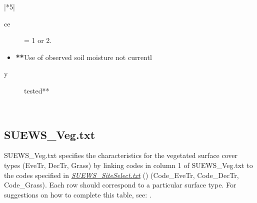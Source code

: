 \documentclass[letterpaper,10pt,english]{sphinxmanual}
\begin{document}
\begin{savenotes}
\begin{tabular}[t]{|*{5}{|}}
\begin{itemize}
\end{itemize}
\begin{description}
\item[{ce}] \leavevmode
= 1 or
2.

\end{description}
\begin{itemize}
\item {} 
{\color{red}\bfseries{}**}Use of
observed
soil
moisture
not
currentl

\end{itemize}
\begin{description}
\item[{y}] \leavevmode
tested**

\end{description}
\\
\hline
\end{tabular}
\par
\sphinxattableend\end{savenotes}


\subsection{SUEWS\_Veg.txt}
\label{\detokenize{input_files/SUEWS_SiteInfo/SUEWS_Veg:suews-veg-txt}}\label{\detokenize{input_files/SUEWS_SiteInfo/SUEWS_Veg::doc}}
SUEWS\_Veg.txt specifies the characteristics for the vegetated surface
cover types (EveTr, DecTr, Grass) by linking codes in column 1 of
SUEWS\_Veg.txt to the codes specified in
{\hyperref[\detokenize{input_files/SUEWS_SiteInfo/SUEWS_Veg:SUEWS_SiteSelect.txt}]{\emph{SUEWS\_SiteSelect.txt}}} () (Code\_EveTr,
Code\_DecTr, Code\_Grass). Each row should correspond to a particular
surface type. For suggestions on how to complete this table, see:
.
\end{document}

